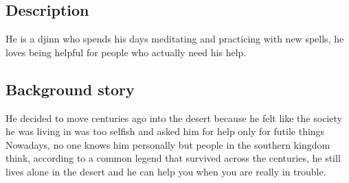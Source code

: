 \subsection{Description}
He is a djinn who spends his days meditating and practicing with new spells, he loves being helpful for people who actually need his help. 


\subsection{Background story}
He decided to move centuries ago into the desert because he felt like the society he was living in was too selfish and asked him for help only for futile things 
Nowadays, no one knows him personally but people in the southern kingdom think, according to a common legend that survived across the centuries, he still lives alone in the desert and he can help you when you are really in trouble.



